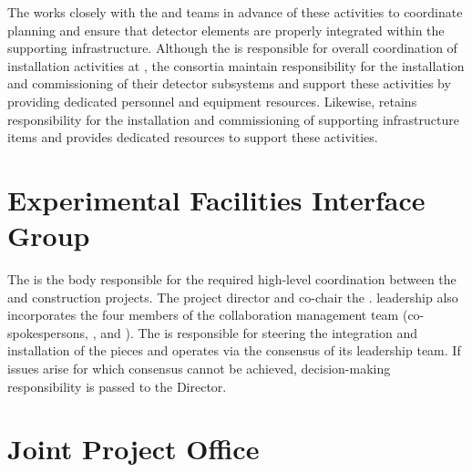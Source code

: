 The  works closely with the  and 
teams in advance of these activities to coordinate planning
and ensure that detector elements are properly integrated within the 
supporting infrastructure.  Although the  is responsible 
for overall coordination of  installation activities
at , the  consortia maintain responsibility 
for the installation and commissioning of their detector subsystems
and support these activities by providing dedicated personnel and
equipment resources.  Likewise,  retains responsibility
for the installation and commissioning of supporting infrastructure
items and provides dedicated resources to support these activities.          

\section{Experimental Facilities Interface Group}
\label{sec:efig}

The  is the body responsible for the required high-level
coordination between the  and  construction 
projects.  The  project director and  
co-chair the .   leadership also incorporates 
the four members of the  collaboration management 
team (co-spokespersons, , and ).  
The  is responsible for steering the integration and   
installation of the  pieces and operates via the 
consensus of its leadership team.  If issues arise for which consensus 
cannot be achieved, decision-making responsibility is passed to the 
 Director.

\section{Joint Project Office}
\label{sec:jpo}

